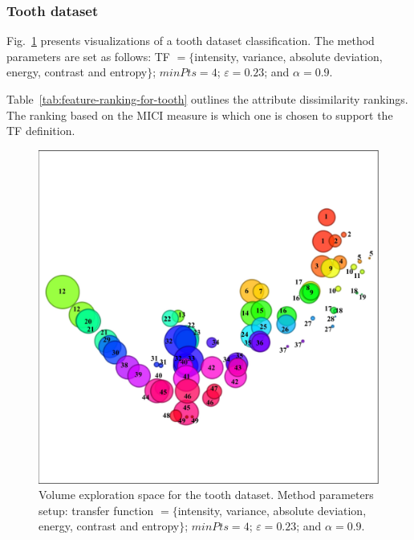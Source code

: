 \subsubsection{Tooth dataset}
\label{subsubsect:tooth-dataset}
Fig.~\ref{fig:tooth-clusters} presents  visualizations of a tooth dataset classification. The method parameters are set as follows:  TF $= \{$intensity, variance, absolute deviation, energy, contrast and entropy$\}$; $minPts = 4$; $\varepsilon = 0.23$; and $\alpha = 0.9$.

Table~\ref{tab:feature-ranking-for-tooth}  outlines the attribute dissimilarity rankings. The ranking based on the MICI measure is which one is chosen to support the TF definition. 

\begin{figure}[htb!]
    \centering
    \includegraphics[width=0.7\columnwidth]{figs/tooth-clusters-tf.jpg} 
    \caption{Volume exploration space for the tooth dataset. Method parameters setup: transfer function $ =\{$intensity, variance, absolute deviation, energy, contrast and entropy$\}$; $minPts = 4$; $\varepsilon = 0.23$; and $\alpha = 0.9$.}
    \label{fig:tooth-clusters}
\end{figure}

